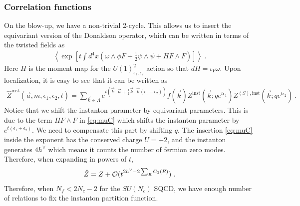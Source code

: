 \documentclass[11pt]{article}
\def\CO{{\cal O}}
\def\e{\epsilon}
\def\i{\iota}
\def\half{\frac{1}{2}}
\begin{document}
\subsubsection{Correlation functions}
On the blow-up, we have a non-trivial 2-cycle. This allows us to insert the equivariant version of the Donaldson operator, which can be written in terms of the twisted fields as
\begin{align} \label{eq:muC}
 \left\langle \exp \left[ t \int d^4 x \left( \omega \wedge \phi F + \half \psi \wedge \psi + H F \wedge F \right) \right] \right\rangle \ . 
\end{align}
Here $H$ is the moment map for the $U(1)^2_{\e_1, \e_2}$ action so that $dH = \i_{V} \omega$. Upon localization, it is easy to see that it can be written as
\begin{align}
 \hat{Z}^{\textrm{inst}}(\vec{a}, m, \e_1, \e_2, t) = \sum_{\vec{k} \in \Lambda} e^{ t \left( \vec{k} \cdot \vec{a} + \half \vec{k}\cdot \vec{k} (\e_1 + \e_2) \right) } f(\vec{k}) Z^{\textrm{inst}}(\vec{k}; q e^{t \e_1} ) Z^{(S), \textrm{inst}}(\vec{k} ; q e^{t \e_2}) \ . 
\end{align} 
Notice that we shift the instanton parameter by equivariant parameters. This is due to the term $H F\wedge F$ in \eqref{eq:muC} which shifts the instanton parameter by $e^{t(\e_1+\e_2)}$. We need to compensate this part by shifting $q$. 
The insertion \eqref{eq:muC} inside the exponent has the conserved charge $U=+2$, and the instanton generates $4h^\vee$ which means it counts the number of fermion zero modes. Therefore, when expanding in powers of $t$, 
\begin{align}
\hat{Z} = Z + \CO(t^{2h^\vee - 2\sum_R C_2(R)})  \ . 
\end{align}
Therefore, when $N_f < 2N_c - 2$ for the $SU(N_c)$ SQCD, we have enough number of relations to fix the instanton partition function. 



\end{document}
